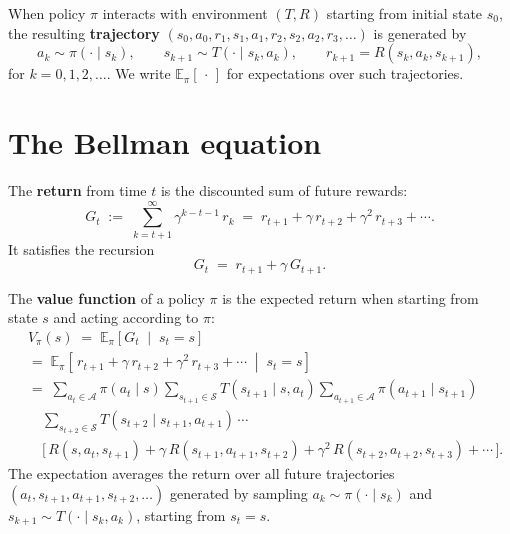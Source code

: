 \documentclass[11pt]{article}
\newcommand{\cS}{\mathcal{S}}
\newcommand{\cA}{\mathcal{A}}
\begin{document}
\begin{definition}[Trajectory]\label{def:trajectory}
When policy $\pi$ interacts with environment $(T, R)$ starting from initial state $s_0$, the resulting \textbf{trajectory} $(s_0, a_0, r_1, s_1, a_1, r_2, s_2, a_2, r_3, \ldots)$ is generated by
\[
    a_k \sim \pi(\cdot \mid s_k), \qquad s_{k+1} \sim T(\cdot \mid s_k, a_k), \qquad r_{k+1} = R(s_k, a_k, s_{k+1}),
\]
for $k = 0, 1, 2, \ldots$. We write $\mathbb{E}_\pi[\,\cdot\,]$ for expectations over such trajectories.
\end{definition}


\section{The Bellman equation}\label{prob:bellman}

\begin{definition}[Return]\label{def:return}
The \textbf{return} from time $t$ is the discounted sum of future rewards:
$$
G_t \;:=\; \sum_{k=t+1}^{\infty} \gamma^{k-t-1}\, r_k \;=\; r_{t+1} + \gamma\, r_{t+2} + \gamma^2\, r_{t+3} + \cdots.
$$
It satisfies the recursion
$$
G_t \;=\; r_{t+1} + \gamma\, G_{t+1}.
$$
\end{definition}

\begin{definition}\label{def:value}
The \textbf{value function} of a policy $\pi$ is the expected return when starting from state $s$ and acting according to $\pi$:
\begin{align*}
&V_\pi(s) \;=\; \mathbb{E}_\pi\!\left[G_t \;\middle|\; s_t = s\right] \\
&=\; \mathbb{E}_\pi\!\left[\,r_{t+1} + \gamma\, r_{t+2} + \gamma^2\, r_{t+3} + \cdots \;\middle|\; s_t = s\right] \\
&=\; \sum_{a_t \in \cA} \pi(a_t \mid s)\! \sum_{s_{t+1} \in \cS} \!T(s_{t+1} \mid s, a_t)\! \sum_{a_{t+1} \in \cA} \pi(a_{t+1} \mid s_{t+1}) \\
&\quad \sum_{s_{t+2} \in \cS} \!T(s_{t+2} \mid s_{t+1}, a_{t+1})\, \cdots \\
&\quad \bigl[\, R(s, a_t, s_{t+1}) + \gamma\, R(s_{t+1}, a_{t+1}, s_{t+2}) + \gamma^2\, R(s_{t+2}, a_{t+2}, s_{t+3}) + \cdots \,\bigr].
\end{align*}
The expectation averages the return over all future trajectories $(a_t, s_{t+1}, a_{t+1}, s_{t+2}, \ldots)$ generated by sampling $a_k \sim \pi(\cdot \mid s_k)$ and $s_{k+1} \sim T(\cdot \mid s_k, a_k)$, starting from $s_t = s$.
\end{definition}
\end{document}
